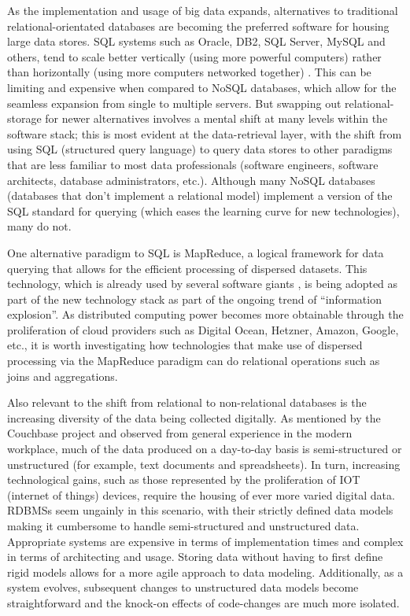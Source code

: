 As the implementation and usage of big data expands, alternatives to traditional relational-orientated databases are becoming the preferred software for housing large data stores. SQL systems such as Oracle, DB2, SQL Server, MySQL and others, tend to scale better vertically (using more powerful computers) rather than horizontally (using more computers networked together) \cite{couchbaseWhitePaper}. This can be limiting and expensive when compared to NoSQL databases, which allow for the seamless expansion from single to multiple servers.  But swapping out relational-storage for newer alternatives involves a mental shift at many levels within the software stack; this is most evident at the data-retrieval layer, with the shift from using SQL (structured query language) to query data stores to other paradigms that are less familiar to most data professionals (software engineers, software architects, database administrators, etc.). Although many NoSQL databases (databases that don't implement a relational model) implement a version of the SQL standard for querying (which eases the learning curve for new technologies), many do not.

One alternative paradigm to SQL is MapReduce, a logical framework for data querying that allows for the efficient processing of dispersed datasets. This technology, which is already used by several software giants \cite{chandar2010}, is being adopted as part of the new technology stack as part of the ongoing trend of ``information explosion''. As distributed computing power becomes more obtainable through the proliferation of cloud providers such as Digital Ocean, Hetzner, Amazon, Google, etc., it is worth investigating how technologies that make use of dispersed processing via the MapReduce paradigm can do relational operations such as joins and aggregations.

Also relevant to the shift from relational to non-relational databases is the increasing diversity of the data being collected digitally. As mentioned by the Couchbase project \cite{couchbaseWhitePaper} and observed from general experience in the modern workplace, much of the data produced on a day-to-day basis is semi-structured or unstructured (for example, text documents and spreadsheets). In turn, increasing technological gains, such as those represented by the proliferation of IOT (internet of things) devices, require the housing of ever more varied digital data. RDBMSs seem ungainly in this scenario, with their strictly defined data models making it cumbersome to handle semi-structured and unstructured data. Appropriate systems are expensive in terms of implementation times and complex in terms of architecting and usage. Storing data without having to first define rigid models allows for a more agile approach to data modeling.  Additionally, as a system evolves, subsequent changes to unstructured data models become straightforward and the knock-on effects of code-changes are much more isolated.

